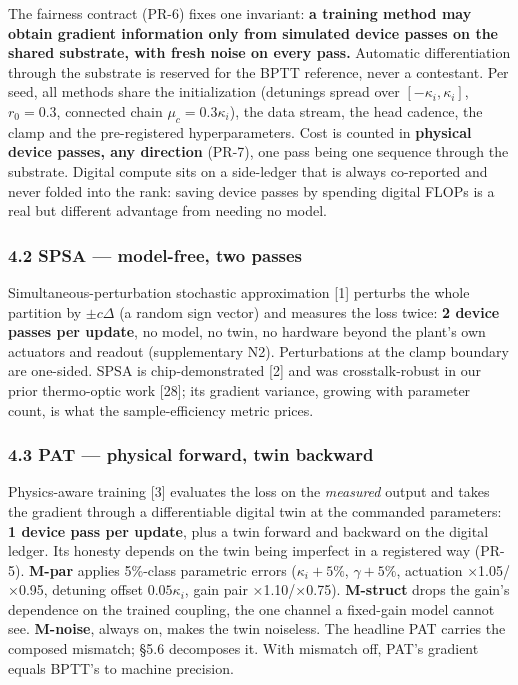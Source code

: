 \documentclass[
  10pt,
]{article}
\begin{document}
The fairness contract (PR-6) fixes one invariant: \textbf{a training
method may obtain gradient information only from simulated device passes
on the shared substrate, with fresh noise on every pass.} Automatic
differentiation through the substrate is reserved for the BPTT
reference, never a contestant. Per seed, all methods share the
initialization (detunings spread over \([-\kappa_i, \kappa_i]\),
\(r_0 = 0.3\), connected chain \(\mu_c = 0.3\kappa_i\)), the data
stream, the head cadence, the clamp and the pre-registered
hyperparameters. Cost is counted in \textbf{physical device passes, any
direction} (PR-7), one pass being one sequence through the substrate.
Digital compute sits on a side-ledger that is always co-reported and
never folded into the rank: saving device passes by spending digital
FLOPs is a real but different advantage from needing no model.

\subsubsection{4.2 SPSA --- model-free, two
passes}\label{spsa-model-free-two-passes}

Simultaneous-perturbation stochastic approximation {[}1{]} perturbs the
whole partition by \(\pm c\Delta\) (a random sign vector) and measures
the loss twice: \textbf{2 device passes per update}, no model, no twin,
no hardware beyond the plant's own actuators and readout (supplementary
N2). Perturbations at the clamp boundary are one-sided. SPSA is
chip-demonstrated {[}2{]} and was crosstalk-robust in our prior
thermo-optic work {[}28{]}; its gradient variance, growing with
parameter count, is what the sample-efficiency metric prices.

\subsubsection{4.3 PAT --- physical forward, twin
backward}\label{pat-physical-forward-twin-backward}

Physics-aware training {[}3{]} evaluates the loss on the \emph{measured}
output and takes the gradient through a differentiable digital twin at
the commanded parameters: \textbf{1 device pass per update}, plus a twin
forward and backward on the digital ledger. Its honesty depends on the
twin being imperfect in a registered way (PR-5). \textbf{M-par} applies
5\%-class parametric errors (\(\kappa_i{+}5\%\), \(\gamma{+}5\%\),
actuation ×1.05/×0.95, detuning offset \(0.05\kappa_i\), gain pair
×1.10/×0.75). \textbf{M-struct} drops the gain's dependence on the
trained coupling, the one channel a fixed-gain model cannot see.
\textbf{M-noise}, always on, makes the twin noiseless. The headline PAT
carries the composed mismatch; §5.6 decomposes it. With mismatch off,
PAT's gradient equals BPTT's to machine precision.
\end{document}
